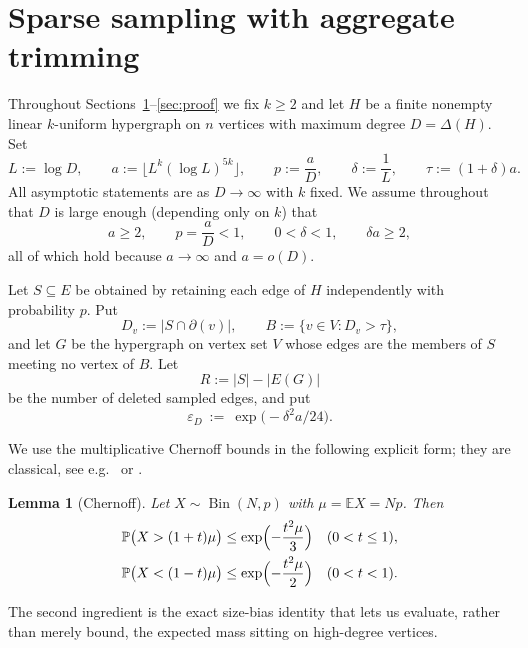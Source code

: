 \documentclass[11pt,a4paper]{amsart}
\theoremstyle{plain}
\newtheorem{lemma}[theorem]{Lemma}
\theoremstyle{definition}
\theoremstyle{remark}
\newcommand{\VV}{V}
\newcommand{\EE}{E}
\newcommand{\PP}{\mathbb{P}}
\newcommand{\EX}{\mathbb{E}}
\newcommand{\Bin}{\operatorname{Bin}}
\newcommand{\dg}{\partial}
\newcommand{\Deltaop}{\Delta}
\begin{document}
\section{Sparse sampling with aggregate trimming}
\label{sec:trim}

Throughout Sections~\ref{sec:trim}--\ref{sec:proof} we fix $k\ge2$ and let $H$ be a
finite nonempty linear $k$-uniform hypergraph on $n$ vertices with maximum degree
$D=\Deltaop(H)$. Set
\begin{equation}
\label{eq:params}
  L:=\log D,\qquad
  a:=\bigl\lfloor L^k(\log L)^{5k}\bigr\rfloor,\qquad
  p:=\frac{a}{D},\qquad
  \delta:=\frac1L,\qquad
  \tau:=(1+\delta)a .
\end{equation}
All asymptotic statements are as $D\to\infty$ with $k$ fixed. We assume throughout that
$D$ is large enough (depending only on $k$) that
\begin{equation}
\label{eq:dlarge}
  a\ge2,\qquad p=\frac{a}{D}<1,\qquad 0<\delta<1,\qquad
  \delta a\ge 2 ,
\end{equation}
all of which hold because $a\to\infty$ and $a=o(D)$.

Let $S\subseteq \EE$ be obtained by retaining each edge of $H$ independently with
probability $p$. Put
\[
  D_v:=|S\cap\dg(v)|,\qquad
  B:=\{v\in \VV: D_v>\tau\},
\]
and let $G$ be the hypergraph on vertex set $\VV$ whose edges are the members of $S$
meeting no vertex of $B$. Let
\[
  R:=|S|-|E(G)|
\]
be the number of deleted sampled edges, and put
\begin{equation}
\label{eq:eps}
  \varepsilon_D\ :=\ \exp\bigl(-\delta^2a/24\bigr).
\end{equation}

We use the multiplicative Chernoff bounds in the following explicit form; they are
classical, see e.g.\ \cite[\S2.1]{JLR} or \cite[Appendix A]{AlonSpencer}.

\begin{lemma}[Chernoff]
\label{lem:chernoff}
Let $X\sim\Bin(N,p)$ with $\mu=\EX X=Np$. Then
\[
\begin{aligned}
  \PP\bigl(X>(1+t)\mu\bigr)&\le \exp\Bigl(-\frac{t^2\mu}{3}\Bigr)
    &&(0<t\le1),\\
  \PP\bigl(X<(1-t)\mu\bigr)&\le \exp\Bigl(-\frac{t^2\mu}{2}\Bigr)
    &&(0<t<1).
\end{aligned}
\]
\end{lemma}

The second ingredient is the exact size-bias identity that lets us evaluate, rather than
merely bound, the expected mass sitting on high-degree vertices.
\end{document}
